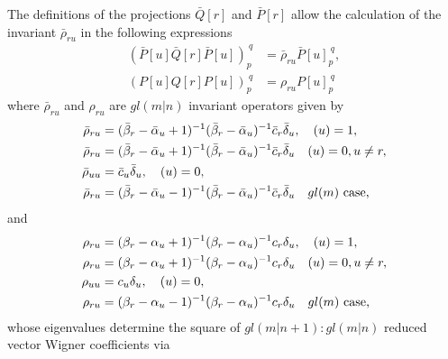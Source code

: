 \documentclass[12pt]{article}
\def\nn{\nonumber}
\begin{document}
The definitions of the projections $\bar{Q}[r]$ and $\bar{P}[r]$ allow the calculation of the invariant $\bar{\rho}_{ru}$ in the following expressions \cite{GIW2}
\begin{align}
(\bar{P}[u]\bar{Q}[r]\bar{P}[u])_p^{\ q} &= \bar{\rho}_{ru}\bar{P}[u]_p^{\ q},\\
({P}[u]{Q}[r]{P}[u])_p^{\ q} &= {\rho}_{ru}{P}[u]_p^{\ q}
\end{align}
where $\bar{\rho}_{ru}$ and ${\rho}_{ru}$ are $gl(m|n)$ invariant operators given by
\begin{align}
\bar{\rho}_{ru} &= (\bar{\beta}_r-\bar{\alpha}_u +
1)^{-1}(\bar{\beta}_r-\bar{\alpha}_u)^{-1}\bar{c}_r\bar{\delta}_u, \ \ \ (u) = 1, \nn\\
\bar{\rho}_{ru} &= (\bar{\beta}_r-\bar{\alpha}_u +
1)^{-1}(\bar{\beta}_r-\bar{\alpha}_u)^{-1}\bar{c}_r\bar{\delta}_u \ \ \ (u) = 0, u \neq r,
\nn\\
\bar{\rho}_{uu} &= \bar{c}_u \bar{\delta}_u, \ \ \ (u) = 0, \nn\\
\bar{\rho}_{ru} &= (\bar{\beta}_r-\bar{\alpha}_u -
1)^{-1}(\bar{\beta}_r-\bar{\alpha}_u)^{-1}\bar{c}_r \bar{\delta}_u \ \ \ gl(m)
\hbox{~case,} 
\label{RhoBarExp}
\end{align}
and
\begin{align}
{\rho}_{ru} &= ({\beta}_r-{\alpha}_u +
1)^{-1}({\beta}_r-{\alpha}_u)^{-1}{c}_r{\delta}_u, \ \ \ (u) = 1, \nn\\
{\rho}_{ru} &= ({\beta}_r-{\alpha}_u +
1)^{-1}({\beta}_r-{\alpha}_u)^{-1}{c}_r{\delta}_u \ \ \ (u) = 0, u \neq r,
\nn\\
{\rho}_{uu} &= {c}_u {\delta}_u, \ \ \ (u) = 0, \nn\\
{\rho}_{ru} &= ({\beta}_r-{\alpha}_u -
1)^{-1}({\beta}_r-{\alpha}_u)^{-1}{c}_r {\delta}_u \ \ \ gl(m)
\hbox{~case,} 
\label{RhoExp}
\end{align}
whose eigenvalues determine the square of $gl(m|n+1):gl(m|n)$ reduced vector Wigner
coefficients via
\end{document}
